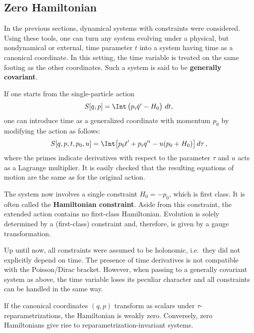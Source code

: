 \subsection{Zero Hamiltonian}

    In the previous sections, dynamical systems with constraints were considered. Using these tools, one can turn any system evolving under a physical, but nondynamical or external, time parameter $t$ into a system having time as a canonical coordinate. In this setting, the time variable is treated on the same footing as the other coordinates. Such a system is said to be \textbf{generally covariant}.

    If one starts from the single-particle action
    \begin{gather}
        S[q,p] = \Int\left(p_i\dot{q}^i-H_0\right)\,dt,
    \end{gather}
    one can introduce time as a generalized coordinate with momentum $p_0$ by modifying the action as follows:
    \begin{gather}
        S[q,p,t,p_0,u] = \Int\bigl[p_0t'+p_iq'^i-u(p_0+H_0)\bigr]\,d\tau\,,
    \end{gather}
    where the primes indicate derivatives with respect to the parameter $\tau$ and $u$ acts as a Lagrange multiplier. It is easily checked that the resulting equations of motion are the same as for the original action.

    The system now involves a single constraint $H_0=-p_0$, which is first class. It is often called the \textbf{Hamiltonian constraint}. Aside from this constraint, the extended action contains no first-class Hamiltonian. Evolution is solely determined by a (first-class) constraint and, therefore, is given by a gauge transformation.

    \begin{remark}[Nonholonomicity]
        Up until now, all constraints were assumed to be holonomic, i.e.~they did not explicitly depend on time. The presence of time derivatives is not compatible with the Poisson/Dirac bracket. However, when passing to a generally covariant system as above, the time variable loses its peculiar character and all constraints can be handled in the same way.
    \end{remark}

    \begin{property}
        If the canonical coordinates $(q,p)$ transform as scalars under $\tau$-reparametrizations, the Hamiltonian is weakly zero. Conversely, zero Hamiltonians give rise to reparametrization-invariant systems.
    \end{property}

